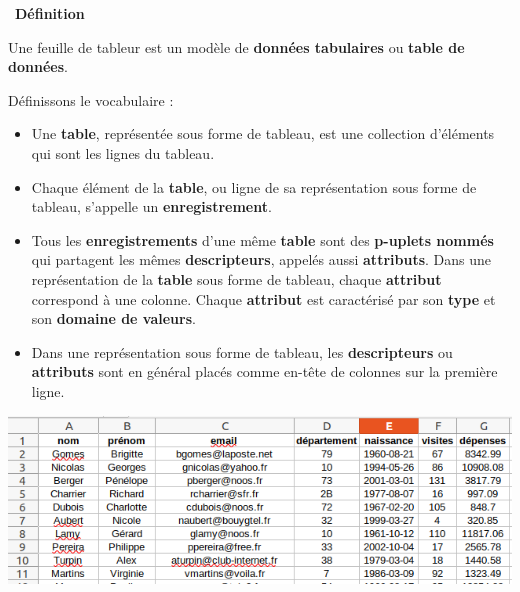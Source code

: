 \documentclass[
  11pt,
]{article}
\newcounter{def}
\newenvironment{definition}[1]
{\par \medskip   \addtocounter{def}{1} \noindent  
\begin{bclogo}[arrondi =0.1,  ombre = true, barre=none, logo=\bcbook, marge=4]{~\textbf{Définition} \textbf{\thedef} {\itshape #1} }  \par}
{
\end{bclogo}
 \par \bigskip }
\begin{document}
\begin{definition}{}

Une feuille de tableur est un modèle de \textbf{données tabulaires} ou
\textbf{table de données}.

Définissons le vocabulaire :

\begin{itemize}
\item
  Une \textbf{table}, représentée sous forme de tableau, est une
  collection d'éléments qui sont les lignes du tableau.
\item
  Chaque élément de la \textbf{table}, ou ligne de sa représentation
  sous forme de tableau, s'appelle un \textbf{enregistrement}.
\item
  Tous les \textbf{enregistrements} d'une même \textbf{table} sont des
  \textbf{p-uplets nommés} qui partagent les mêmes
  \textbf{descripteurs}, appelés aussi \textbf{attributs}. Dans une
  représentation de la \textbf{table} sous forme de tableau, chaque
  \textbf{attribut} correspond à une colonne. Chaque \textbf{attribut}
  est caractérisé par son \textbf{type} et son \textbf{domaine de
  valeurs}.
\item
  Dans une représentation sous forme de tableau, les
  \textbf{descripteurs} ou \textbf{attributs} sont en général placés
  comme en-tête de colonnes sur la première ligne.
\end{itemize}

\end{definition}

\includegraphics{images/tableur.png}\\
\end{document}
